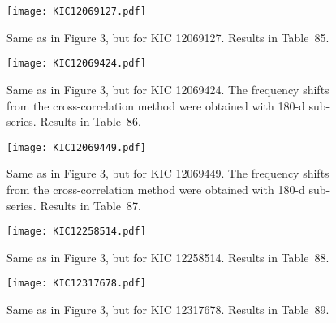\documentclass[twocolumn]{aastex61}%
\begin{document}
\begin{figure}[ht]
\texttt{[image: KIC12069127.pdf]}
\caption{Same as in Figure 3, but for KIC 12069127. Results in Table~85.}\label{fig:12069127}%
\end{figure}

\begin{figure}[ht]
\texttt{[image: KIC12069424.pdf]}\vspace{-0.2cm}
\caption{Same as in Figure 3, but for KIC 12069424. The frequency shifts from the cross-correlation method were obtained with 180-d sub-series. Results in Table~86.}\label{fig:12069424}\vspace{-0.3cm}%
\end{figure}

\begin{figure}[ht]
\texttt{[image: KIC12069449.pdf]}\vspace{-0.2cm}
\caption{Same as in Figure 3, but for KIC 12069449. The frequency shifts from the cross-correlation method were obtained with 180-d sub-series. Results in Table~87.}\label{fig:12069449}\vspace{-1.8cm}%
\end{figure}

\begin{figure}[ht]
\texttt{[image: KIC12258514.pdf]}
\caption{Same as in Figure 3, but for KIC 12258514. Results in Table~88.}\label{fig:12258514}%
\end{figure}

\begin{figure}[ht]
\texttt{[image: KIC12317678.pdf]}
\caption{Same as in Figure 3, but for KIC 12317678. Results in Table~89.}\label{fig:12317678}%
\end{figure}
\end{document}
